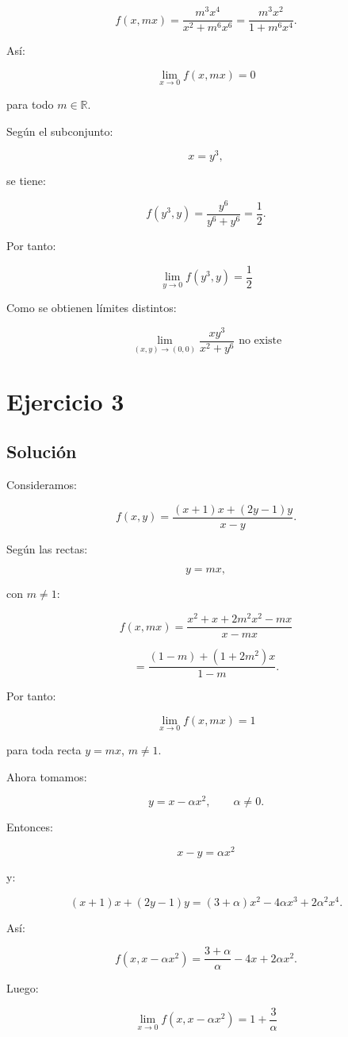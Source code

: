 \documentclass[11pt,a4paper]{article}
\newcommand{\R}{\mathbb{R}}
\begin{document}
\[
f(x,mx)
=
\frac{m^3x^4}{x^2+m^6x^6}
=
\frac{m^3x^2}{1+m^6x^4}.
\]

Así:

\[
\boxed{
\lim_{x\to0}f(x,mx)=0
}
\]

para todo \(m\in\R\).

Según el subconjunto:

\[
x=y^3,
\]

se tiene:

\[
f(y^3,y)
=
\frac{y^6}{y^6+y^6}
=
\frac12.
\]

Por tanto:

\[
\boxed{
\lim_{y\to0}f(y^3,y)=\frac12
}
\]

Como se obtienen límites distintos:

\[
\boxed{
\lim_{(x,y)\to(0,0)}
\frac{xy^3}{x^2+y^6}
\text{ no existe}
}
\]

\section{Ejercicio 3}
\subsection{Solución}

Consideramos:

\[
f(x,y)
=
\frac{(x+1)x+(2y-1)y}{x-y}.
\]

Según las rectas:

\[
y=mx,
\]

con \(m\neq1\):

\[
f(x,mx)
=
\frac{x^2+x+2m^2x^2-mx}{x-mx}
\]

\[
=
\frac{(1-m)+(1+2m^2)x}{1-m}.
\]

Por tanto:

\[
\boxed{
\lim_{x\to0}f(x,mx)=1
}
\]

para toda recta \(y=mx\), \(m\neq1\).

Ahora tomamos:

\[
y=x-\alpha x^2,
\qquad
\alpha\neq0.
\]

Entonces:

\[
x-y=\alpha x^2
\]

y:

\[
(x+1)x+(2y-1)y
=
(3+\alpha)x^2
-
4\alpha x^3
+
2\alpha^2x^4.
\]

Así:

\[
f(x,x-\alpha x^2)
=
\frac{3+\alpha}{\alpha}
-
4x
+
2\alpha x^2.
\]

Luego:

\[
\boxed{
\lim_{x\to0}
f(x,x-\alpha x^2)
=
1+\frac3\alpha
}
\]
\end{document}
